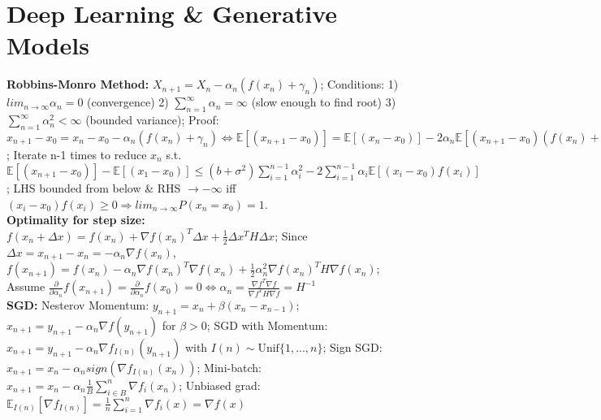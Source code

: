 \section{Deep Learning \& Generative Models}
\textbf{Robbins-Monro Method: } 
$X_{n+1} = X_{n} - \alpha_n (f(x_n) + \gamma_n)$; Conditions: 1) $lim_{n\rightarrow \infty}\alpha_n = 0$ (convergence) 2) $\sum_{n=1}^{\infty}\alpha_n = \infty$ (slow enough to find root) 3) $\sum_{n=1}^{\infty}\alpha_n^{2} < \infty$  (bounded variance); Proof:
$x_{n+1} - x_0 = x_n - x_0 - \alpha_n (f(x_n) + \gamma_n) \Leftrightarrow \mathbb{E}[(x_{n+1} - x_0)] = \mathbb{E}[(x_{n} - x_0)] - 2\alpha_n \mathbb{E}[(x_{n+1} - x_0)(f(x_n)+\gamma_n)] + \alpha_n^2 \mathbb{E}[f^2(x_n)+2f(x_n)\gamma_n+\gamma_n^2] = \mathbb{E}[(x_{n} - x_0)] + \alpha_n^2 \mathbb{E}[(x_n - x_0)f(x_n)] - 2\alpha_n\mathbb{E}[\gamma_n^2]$; Iterate n-1 times to reduce $x_n$ s.t. $\mathbb{E}[(x_{n+1} - x_0)] - \mathbb{E}[(x_1 - x_0)] \leq (b + \sigma^2) \sum_{i=1}^{n-1}\alpha_i^2 - 2\sum_{i=1}^{n-1}\alpha_i\mathbb{E}[(x_i - x_0)f(x_i)]$; LHS bounded from below \& RHS $\rightarrow -\infty$ iff $(x_i - x_0)f(x_i) \geq 0 \Rightarrow lim_{n\rightarrow \infty} P(x_n = x_0) = 1$.
\\
\textbf{Optimality for step size: } 
$f(x_n + \Delta x) = f(x_n) + \nabla f(x_n)^T\Delta x + \frac{1}{2}\Delta x^T H \Delta x$; Since $\Delta x = x_{n+1} - x_n = -\alpha_n \nabla f(x_n)$, $f(x_{n+1}) = f(x_n) - \alpha_n \nabla f(x_n)^T\nabla f(x_n) + \frac{1}{2}\alpha_n^2 \nabla f(x_n)^T H \nabla f(x_n)$;
Assume $\frac{\partial}{\partial \alpha_n}f(x_{n+1}) = \frac{\partial}{\partial \alpha_n}f(x_0) = 0 \Leftrightarrow \alpha_n  = \frac{\nabla f^T \nabla f}{\nabla f^T H \nabla f} = H^{-1}$
\\
\textbf{SGD: } 
Nesterov Momentum: $y_{n+1} = x_n + \beta(x_n - x_{n-1})$; $x_{n+1} = y_{n+1} - \alpha_n \nabla f(y_{n+1})$ for $\beta > 0$; SGD with Momentum: $x_{n+1} = y_{n+1} - \alpha_{n} \nabla f_{I(n)}(y_{n+1})$ with $I(n) \sim \text{Unif}\{1, ..., n\}$; Sign SGD: $x_{n+1} = x_n - \alpha_n sign(\nabla f_{I(n)}(x_n))$; Mini-batch: $x_{n+1} = x_n - \alpha_n \frac{1}{B}\sum_{i \in B}^n \nabla f_i(x_n)$; Unbiased grad: $\mathbb{E}_{I(n)}[\nabla f_{I(n)}] = \frac{1}{n}\sum_{i=1}^{n}\nabla f_i(x) = \nabla f(x)$
